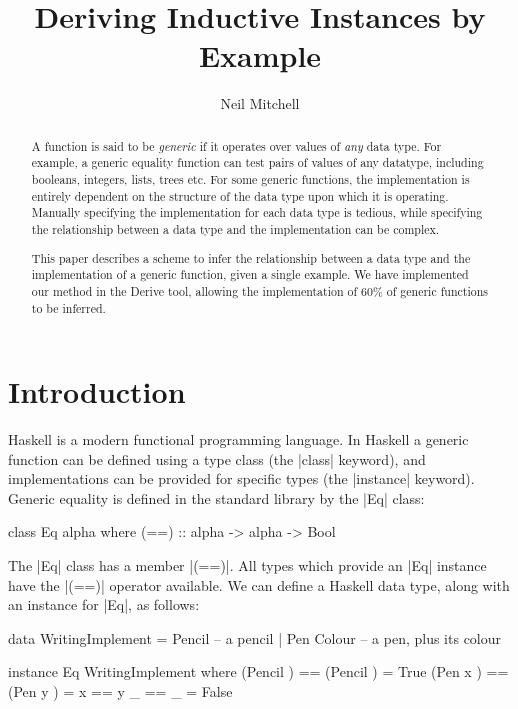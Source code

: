 \documentclass{llncs}
\begin{document}
\title{Deriving Inductive Instances by Example}
\author{Neil Mitchell}


\maketitle

\begin{abstract}
A function is said to be \textit{generic} if it operates over values of \textit{any} data type. For example, a generic equality function can test pairs of values of any datatype, including booleans, integers, lists, trees etc. For some generic functions, the implementation is entirely dependent on the structure of the data type upon which it is operating. Manually specifying the implementation for each data type is tedious, while specifying the relationship between a data type and the implementation can be complex.

This paper describes a scheme to infer the relationship between a data type and the implementation of a generic function, given a single example. We have implemented our method in the Derive tool, allowing the implementation of 60\% of generic functions to be inferred.
\end{abstract}

\section{Introduction}

Haskell \cite{haskell} is a modern functional programming language. In Haskell a generic function can be defined using a type class \cite{wadler:type_classes} (the |class| keyword), and implementations can be provided for specific types (the |instance| keyword). Generic equality is defined in the standard library by the |Eq| class:

\begin{code}
class Eq alpha where
    (==) :: alpha -> alpha -> Bool
\end{code}

The |Eq| class has a member |(==)|. All types which provide an |Eq| instance have the |(==)| operator available. We can define a Haskell data type, along with an instance for |Eq|, as follows:

\begin{code}
data WritingImplement  =  Pencil       -- a pencil
                       |  Pen Colour   -- a pen, plus its colour

instance Eq WritingImplement where
    (Pencil     )  == (Pencil     )  = True
    (Pen     x  )  == (Pen     y  )  = x == y
    _              == _              = False
\end{code}
\end{document}

